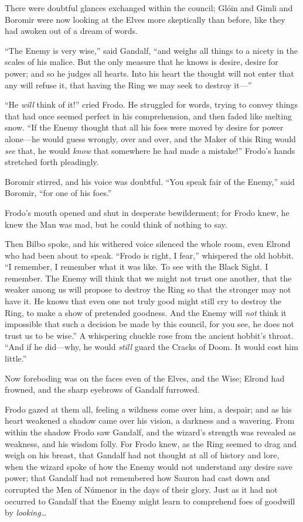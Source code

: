 There were doubtful glances exchanged within the council; Glóin and
Gimli and Boromir were now looking at the Elves more skeptically than
before, like they had awoken out of a dream of words.

``The Enemy is very wise,'' said Gandalf, ``and weighs all things to a
nicety in the scales of his malice. But the only measure that he knows
is desire, desire for power; and so he judges all hearts. Into his heart
the thought will not enter that any will refuse it, that having the Ring
we may seek to destroy it---''

``He \emph{will} think of it!'' cried Frodo. He struggled for words,
trying to convey things that had once seemed perfect in his
comprehension, and then faded like melting snow. ``If the Enemy thought
that all his foes were moved by desire for power alone---he would guess
wrongly, over and over, and the Maker of this Ring would \emph{see}
that, he would \emph{know} that somewhere he had made a mistake!''
Frodo's hands stretched forth pleadingly.

Boromir stirred, and his voice was doubtful. ``You speak fair of the
Enemy,'' said Boromir, ``for one of his foes.''

Frodo's mouth opened and shut in desperate bewilderment; for Frodo knew,
he knew the Man was mad, but he could think of nothing to say.

Then Bilbo spoke, and his withered voice silenced the whole room, even
Elrond who had been about to speak. ``Frodo is right, I fear,''
whispered the old hobbit. ``I remember, I remember what it was like. To
see with the Black Sight. I remember. The Enemy will think that we might
not trust one another, that the weaker among us will propose to destroy
the Ring so that the stronger may not have it. He knows that even one
not truly good might still cry to destroy the Ring, to make a show of
pretended goodness. And the Enemy will \emph{not} think it impossible
that such a decision be made by this council, for you see, he does not
trust us to be wise.'' A whispering chuckle rose from the ancient
hobbit's throat. ``And if he did---why, he would \emph{still} guard the
Cracks of Doom. It would cost him little.''

Now foreboding was on the faces even of the Elves, and the Wise; Elrond
had frowned, and the sharp eyebrows of Gandalf furrowed.

Frodo gazed at them all, feeling a wildness come over him, a despair;
and as his heart weakened a shadow came over his vision, a darkness and
a wavering. From within the shadow Frodo saw Gandalf, and the wizard's
strength was revealed as weakness, and his wisdom folly. For Frodo knew,
as the Ring seemed to drag and weigh on his breast, that Gandalf had not
thought at all of history and lore, when the wizard spoke of how the
Enemy would not understand any desire save power; that Gandalf had not
remembered how Sauron had cast down and corrupted the Men of Númenor in
the days of their glory. Just as it had not occurred to Gandalf that the
Enemy might learn to comprehend foes of goodwill by
\emph{looking\ldots{}}

